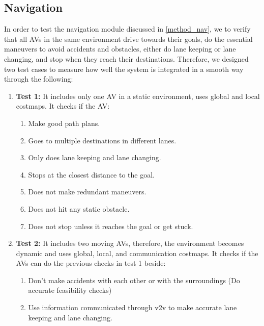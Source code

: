 

\subsection{Navigation}
In order to test the navigation module discussed in \ref{method_nav}, we to verify that all AVs in the same environment drive towards their goals, do the essential maneuvers to avoid accidents and obstacles, either do lane keeping or lane changing, and stop when they reach their destinations. Therefore, we designed two test cases to measure how well the system is integrated in a smooth way through the following:
\begin{enumerate}
    \item \textbf{Test 1:}\label{NavTest1P} It includes only one AV in a static environment, uses global and local costmaps. It checks if the AV:
    \begin{enumerate}
        \item \label{NavTest1P1}Make good path plans. 
        \item \label{NavTest1P2}Goes to multiple destinations in different lanes.
        \item \label{NavTest1P3}Only does lane keeping and lane changing.
        \item \label{NavTest1P4}Stops at the closest distance to the goal. 
        \item \label{NavTest1P5}Does not make redundant maneuvers. 
        \item \label{NavTest1P6}Does not hit any static obstacle. 
        \item \label{NavTest1P7}Does not stop unless it reaches the goal or get stuck. 
    \end{enumerate}
    \item \textbf{Test 2:}\label{NavTest2P} It includes two moving AVs, therefore, the environment becomes dynamic and uses global, local, and communication costmaps. It checks if the AVs can do the previous checks in test 1 beside: 
    \begin{enumerate}
        \item \label{NavTest2P1}Don't make accidents with each other or with the surroundings (Do accurate feasibility checks)
        \item \label{NavTest2P2}Use information communicated through v2v to make accurate lane keeping and lane changing.
    \end{enumerate}
\end{enumerate}

